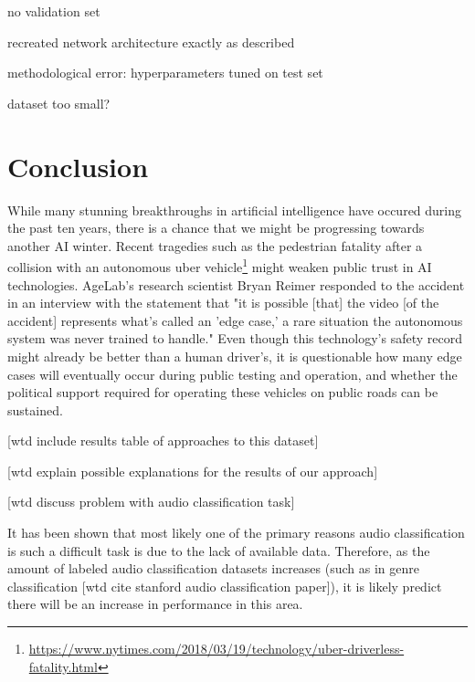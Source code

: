 no validation set


recreated network architecture exactly as described


methodological error: hyperparameters tuned on test set

dataset too small?





\chapter{Conclusion}

While many stunning breakthroughs in artificial intelligence have occured during the past ten years, there is a chance that we might be progressing towards another AI winter. Recent tragedies such as the pedestrian fatality after a collision with an autonomous uber vehicle\footnote{\url{https://www.nytimes.com/2018/03/19/technology/uber-driverless-fatality.html}} might weaken public trust in AI technologies. AgeLab's research scientist Bryan Reimer responded to the accident in an interview with the statement that "it is possible [that] the video [of the accident] represents what's called an 'edge case,' a rare situation the autonomous system was never trained to handle." Even though this technology's safety record might already be better than a human driver's, it is questionable how many edge cases will eventually occur during public testing and operation, and whether the political support required for operating these vehicles on public roads can be sustained.

[wtd include results table of approaches to this dataset]

[wtd explain possible explanations for the results of our approach]

[wtd discuss problem with audio classification task]

It has been shown that most likely one of the primary reasons audio classification is such a difficult task is due to the lack of available data.  Therefore, as the amount of labeled audio classification datasets increases (such as in genre classification [wtd cite stanford audio classification paper]), it is likely predict there will be an increase in performance in this area.

